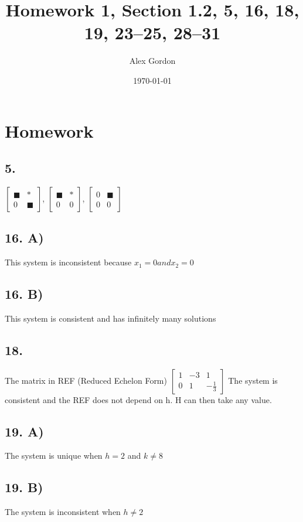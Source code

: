 \documentclass[12]{scrartcl}
\begin{document}
\title{Homework 1, Section 1.2, 5, 16, 18, 19, 23–25, 28–31 }
\author{Alex Gordon}
\date{\today}
\maketitle
\section*{Homework}
\subsection*{5.}
$ \begin{bmatrix} \blacksquare & * \\ 0&\blacksquare \end{bmatrix} $,
$ \begin{bmatrix} \blacksquare & * \\ 0&0 \end{bmatrix} $,
$ \begin{bmatrix} 0 &\blacksquare \\ 0&0 \end{bmatrix} $

\subsection*{16. A)}
This system is inconsistent because $x_1 = 0 and x_2 = 0$
\subsection*{16. B)}
This system is consistent and has infinitely many solutions

\subsection*{18.}
The matrix in REF (Reduced Echelon Form)
$ \begin{bmatrix} 1 &-3 & 1 \\ 0&1 & -\frac{1}{3} \end{bmatrix} $
The system is consistent and the REF does not depend on h. H can then take any value. 
\subsection*{19. A)}
The system is unique when $h = 2 $ and $k \neq 8$
\subsection*{19. B)}
The system is inconsistent when $h \neq 2 $ 
\end{document}
